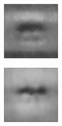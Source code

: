 \begin{figure}[H]
\begin{subfigure}[t]{0.13\textwidth}
  \end{subfigure}
  \begin{subfigure}[t]{0.13\textwidth}
    \centering
    \includegraphics[width=\linewidth]{img/one-trial/prediction_1_mse.png}
  \end{subfigure}
  \begin{subfigure}[t]{0.13\textwidth}
    \centering
    \includegraphics[width=\linewidth]{img/one-trial/prediction_1_ssim.png}

\end{subfigure}
\end{figure}
